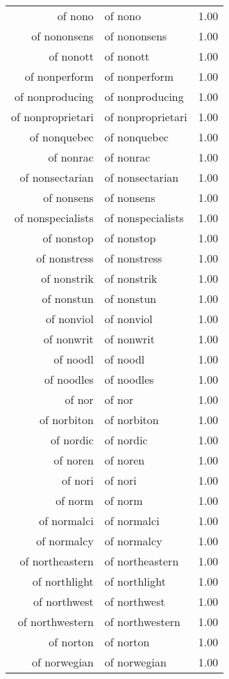 \begin{table}[ht]
\begin{tabular}{rlr}
  of nono & of nono & 1.00 \\ 
  of nononsens & of nononsens & 1.00 \\ 
  of nonott & of nonott & 1.00 \\ 
  of nonperform & of nonperform & 1.00 \\ 
  of nonproducing & of nonproducing & 1.00 \\ 
  of nonproprietari & of nonproprietari & 1.00 \\ 
  of nonquebec & of nonquebec & 1.00 \\ 
  of nonrac & of nonrac & 1.00 \\ 
  of nonsectarian & of nonsectarian & 1.00 \\ 
  of nonsens & of nonsens & 1.00 \\ 
  of nonspecialists & of nonspecialists & 1.00 \\ 
  of nonstop & of nonstop & 1.00 \\ 
  of nonstress & of nonstress & 1.00 \\ 
  of nonstrik & of nonstrik & 1.00 \\ 
  of nonstun & of nonstun & 1.00 \\ 
  of nonviol & of nonviol & 1.00 \\ 
  of nonwrit & of nonwrit & 1.00 \\ 
  of noodl & of noodl & 1.00 \\ 
  of noodles & of noodles & 1.00 \\ 
  of nor & of nor & 1.00 \\ 
  of norbiton & of norbiton & 1.00 \\ 
  of nordic & of nordic & 1.00 \\ 
  of noren & of noren & 1.00 \\ 
  of nori & of nori & 1.00 \\ 
  of norm & of norm & 1.00 \\ 
  of normalci & of normalci & 1.00 \\ 
  of normalcy & of normalcy & 1.00 \\ 
  of northeastern & of northeastern & 1.00 \\ 
  of northlight & of northlight & 1.00 \\ 
  of northwest & of northwest & 1.00 \\ 
  of northwestern & of northwestern & 1.00 \\ 
  of norton & of norton & 1.00 \\ 
  of norwegian & of norwegian & 1.00 \\ 

\end{tabular}
\end{table}
